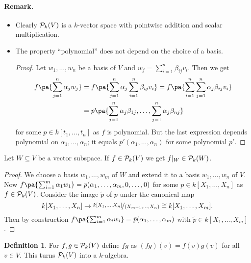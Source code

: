 \documentclass[12pt,a4paper]{scrartcl}
\theoremstyle{cplain}
\theoremstyle{cplain}
\theoremstyle{cplain}
\theoremstyle{definition}
\newtheorem*{deff}{Definition}
\begin{document}
\begin{otherlanguage}{english}
\paragraph{Remark.}
\begin{itemize}
  \item Clearly $\mathcal{P}_k(V)$ is a $k$-vector space with pointwise addition and scalar multiplication.
  \item The property \enquote{polynomial} does not depend on the choice of a basis.
  \begin{proof}
    Let $w_1,\ldots,w_n$ be a basis of $V$ and $w_j = \sum_{i=1}^n \beta_{ij} v_i$. Then we get \begin{align*} f\pa{\sum_{j=1}^n\alpha_jw_j} &= f\pa{\sum_{j=1}^n\alpha_j \sum_{i=1}^n\beta_{ij}v_i} = f\pa{\sum_{i=1}^n \sum_{j=1}^n\alpha_j\beta_{ij}v_i} \\ &= p\pa{\sum_{j=1}^n\alpha_j\beta_{1j},\ldots,\sum_{j=1}^n\alpha_j\beta_{nj}} \end{align*} for some $p \in k[t_1,\ldots,t_n]$ as $f$ is polynomial. But the last expression depends polynomial on $\alpha_1,\ldots,\alpha_n$; it equals $p'(\alpha_1,\ldots,\alpha_n)$ for some polynomial $p'$.
  \end{proof}
\end{itemize}

\begin{lem}
  Let $W \subseteq V$ be a vector subspace. If $f \in \mathcal{P}_k(V)$ we get $f|_W \in \mathcal{P}_k(W)$.
\end{lem}
\begin{proof}
  We choose a basis $w_1,\ldots,w_m$ of $W$ and extend it to a basis $w_1,\ldots,w_n$ of $V$. Now $f\pa{\sum_{i=1}^m \alpha_1w_1} = p(\alpha_1,\ldots,\alpha_m,0,\ldots,0)$ for some $p\in k[X_1,\ldots,X_n]$ as $f \in \mathcal{P}_k(V)$. Consider the image $\tilde p$ of $p$ under the canonical map \[k[X_1,\ldots,X_n] \to \nicefrac{k[X_1,\ldots,X_n]}{(X_{m+1},\ldots,X_n)} \cong k[X_1,\ldots,X_m].\] Then by construction $f\pa{\sum_{i=1}^m\alpha_iw_i} = \tilde p(\alpha_1,\ldots,\alpha_m)$ with $\tilde p \in k[X_1,\ldots,X_m]$.
\end{proof}

\begin{deff}
  For $f,g \in \mathcal{P}_k(V)$ define $fg$ as $(fg)(v) = f(v)g(v)$ for all $v \in V$. This turns $\mathcal{P}_k(V)$ into a $k$-algebra.
\end{deff}


\end{otherlanguage}
\end{document}
